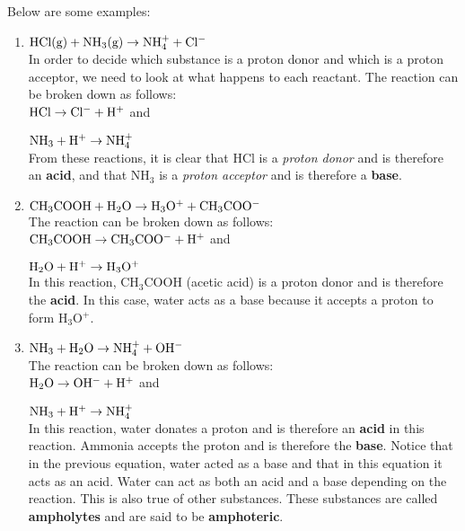 
Below are some examples:

\begin{enumerate}
\item{$\rm{HCl(g) + NH_{3}(g) \rightarrow NH_{4}^{+} + Cl^{-}}$\\

In order to decide which substance is a proton donor and which is a proton acceptor, we need to look at what happens to each reactant. The reaction can be broken down as follows:\\

$\rm{HCl \rightarrow Cl^{-} + H^{+}}$ and

$\rm{NH_{3} + H^{+} \rightarrow NH_{4}^{+}}$\\

From these reactions, it is clear that HCl is a \textit{proton donor} and is therefore an \textbf{acid}, and that NH$_{3}$ is a \textit{proton acceptor} and is therefore a \textbf{base}. 
}

\item{$\rm{CH_{3}COOH + H_{2}O \rightarrow H_{3}O^{+} + CH_{3}COO^{-}}$\\

The reaction can be broken down as follows:\\

$\rm{CH_{3}COOH \rightarrow CH_{3}COO^{-} + H^{+}}$ and

$\rm{H_{2}O + H^{+} \rightarrow H_{3}O^{+}}$\\

In this reaction, CH$_{3}$COOH (acetic acid) is a proton donor and is therefore the \textbf{acid}. In this case, water acts as a base because it accepts a proton to form H$_{3}$O$^{+}$.
}

\item{$\rm{NH_{3} + H_{2}O \rightarrow NH_{4}^{+} + OH^{-}}$\\

The reaction can be broken down as follows:\\

$\rm{H_{2}O \rightarrow OH^{-} + H^{+}}$ and

$\rm{NH_{3} + H^{+} \rightarrow NH_{4}^{+}}$\\

In this reaction, water donates a proton and is therefore an \textbf{acid} in this reaction. Ammonia accepts the proton  and is therefore the \textbf{base}. Notice that in the previous equation, water acted as a base and that in this equation it acts as an acid. Water can act as both an acid and a base depending on the reaction. This is also true of other substances. These substances are called \textbf{ampholytes} and are said to be \textbf{amphoteric}.}
\end{enumerate}

